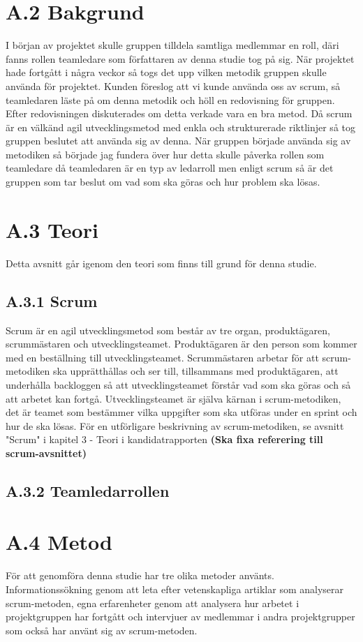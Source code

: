 \section{A.2 Bakgrund}
I början av projektet skulle gruppen tilldela samtliga medlemmar en roll, däri fanns rollen teamledare som författaren av denna studie tog på sig. När projektet hade fortgått i några veckor så togs det upp vilken metodik gruppen skulle använda för projektet. Kunden föreslog att vi kunde använda oss av scrum, så teamledaren läste på om denna metodik och höll en redovisning för gruppen. Efter redovisningen diskuterades om detta verkade vara en bra metod. Då scrum är en välkänd agil utvecklingsmetod med enkla och strukturerade riktlinjer så tog gruppen beslutet att använda sig av denna. När gruppen började använda sig av metodiken så började jag fundera över hur detta skulle påverka rollen som teamledare då teamledaren är en typ av ledarroll men enligt scrum så är det gruppen som tar beslut om vad som ska göras och hur problem ska lösas.

\section{A.3 Teori}
Detta avsnitt går igenom den teori som finns till grund för denna studie.

\subsection{A.3.1 Scrum}
Scrum är en agil utvecklingsmetod som består av tre organ, produktägaren, scrummästaren och utvecklingsteamet. Produktägaren är den person som kommer med en beställning till utvecklingsteamet. Scrummästaren arbetar för att scrum-metodiken ska upprätthållas och ser till, tillsammans med produktägaren, att underhålla backloggen så att utvecklingsteamet förstår vad som ska göras och så att arbetet kan fortgå. Utvecklingsteamet är själva kärnan i scrum-metodiken, det är teamet som bestämmer vilka uppgifter som ska utföras under en sprint och hur de ska lösas. För en utförligare beskrivning av scrum-metodiken, se avsnitt "Scrum" i kapitel 3 - Teori i kandidatrapporten \textbf{(Ska fixa referering till scrum-avsnittet)}

\subsection{A.3.2 Teamledarrollen}

\section{A.4 Metod}
För att genomföra denna studie har tre olika metoder använts. Informationssökning genom att leta efter vetenskapliga artiklar som analyserar scrum-metoden, egna erfarenheter genom att analysera hur arbetet i projektgruppen har fortgått och intervjuer av medlemmar i andra projektgrupper som också har använt sig av scrum-metoden.

